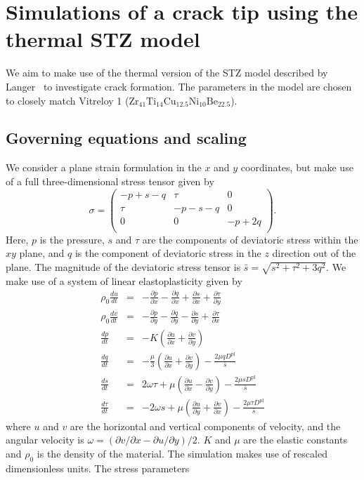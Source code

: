 \documentclass[12pt]{article}
\newcommand{\p}{\partial}
\newcommand{\drt}[1]{\frac{d #1}{d t}}
\newcommand{\prx}[1]{\frac{\p #1}{\p x}}
\newcommand{\pry}[1]{\frac{\p #1}{\p y}}
\newcommand{\Dpl}{D^\textrm{pl}}
\begin{document}
\section*{Simulations of a crack tip using the thermal STZ model}
We aim to make use of the thermal version of the STZ model described by
Langer~\cite{langer08} to investigate crack formation. The parameters in the
model are chosen to closely match Vitreloy 1
($\textrm{Zr}_{41}\textrm{Ti}_{14}\textrm{Cu}_{12.5}\textrm{Ni}_{10}\textrm{Be}_{22.5}$).

\subsection*{Governing equations and scaling}
We consider a plane strain formulation in the $x$ and $y$ coordinates, but make
use of a full three-dimensional stress tensor given by
\[
\sigma = \left(
\begin{array}{ccc}
  -p + s -q & \tau & 0 \\
  \tau & -p-s-q & 0 \\
  0 & 0 & -p + 2q \\
\end{array}
\right).
\]
Here, $p$ is the pressure, $s$ and $\tau$ are the components of deviatoric
stress within the $xy$ plane, and $q$ is the component of deviatoric stress in
the $z$ direction out of the plane. The magnitude of the deviatoric stress
tensor is $\bar{s}=\sqrt{s^2+\tau^2+3q^2}$. We make use of a system of linear
elastoplasticity given by
\begin{eqnarray}
  \label{eq:sys_start} \rho_0 \drt{u}&=&-\prx{p}-\prx{q}+\prx{s}+\pry{\tau} \\
  \rho_0 \drt{v}&=&-\pry{p}-\pry{q}-\pry{s}+\prx{\tau} \\
  \drt{p} &=& -K \left(\prx{u} +\pry{v}\right) \\
  \drt{q} &=& -\frac{\mu}{3} \left(\prx{u} + \pry{v}\right) -\frac{2\mu q \Dpl}{\bar{s}}\\
  \drt{s} &=& 2\omega \tau + \mu\left( \prx{u} - \pry{v} \right) - \frac{2\mu s \Dpl}{\bar{s}} \\
  \label{eq:sys_end} \drt{\tau} &=& - 2\omega s + \mu \left( \pry{u} + \prx{v} \right) - \frac{2\mu \tau \Dpl}{\bar{s}}
\end{eqnarray}
where $u$ and $v$ are the horizontal and vertical components of velocity,
and the angular velocity is $\omega= (\p v /\p x - \p u / \p y)/2$. $K$ and
$\mu$ are the elastic constants and $\rho_0$ is the density of the material.
The simulation makes use of rescaled dimensionless units. The stress parameters
\end{document}
